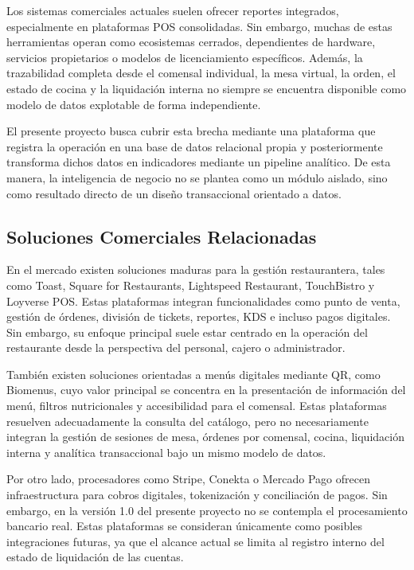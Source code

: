 Los sistemas comerciales actuales suelen ofrecer reportes integrados, especialmente en
plataformas POS consolidadas. Sin embargo, muchas de estas herramientas operan como
ecosistemas cerrados, dependientes de hardware, servicios propietarios o modelos de
licenciamiento espec\'ificos. Adem\'as, la trazabilidad completa desde el comensal individual,
la mesa virtual, la orden, el estado de cocina y la liquidaci\'on interna no siempre se
encuentra disponible como modelo de datos explotable de forma independiente.

El presente proyecto busca cubrir esta brecha mediante una plataforma que registra la
operaci\'on en una base de datos relacional propia y posteriormente transforma dichos datos
en indicadores mediante un pipeline anal\'itico. De esta manera, la inteligencia de negocio
no se plantea como un m\'odulo aislado, sino como resultado directo de un dise\~no transaccional
orientado a datos.

\subsection{Soluciones Comerciales Relacionadas}

En el mercado existen soluciones maduras para la gesti\'on restaurantera, tales como Toast,
Square for Restaurants, Lightspeed Restaurant, TouchBistro y Loyverse POS. Estas plataformas
integran funcionalidades como punto de venta, gesti\'on de \'ordenes, divisi\'on de tickets, reportes,
KDS e incluso pagos digitales. Sin embargo, su enfoque principal suele estar centrado en la
operaci\'on del restaurante desde la perspectiva del personal, cajero o administrador.

Tambi\'en existen soluciones orientadas a men\'us digitales mediante QR, como Biomenus, cuyo
valor principal se concentra en la presentaci\'on de informaci\'on del men\'u, filtros nutricionales
y accesibilidad para el comensal. Estas plataformas resuelven adecuadamente la consulta del
cat\'alogo, pero no necesariamente integran la gesti\'on de sesiones de mesa, \'ordenes por comensal,
cocina, liquidaci\'on interna y anal\'itica transaccional bajo un mismo modelo de datos.

Por otro lado, procesadores como Stripe, Conekta o Mercado Pago ofrecen infraestructura para
cobros digitales, tokenizaci\'on y conciliaci\'on de pagos. Sin embargo, en la versi\'on 1.0 del
presente proyecto no se contempla el procesamiento bancario real. Estas plataformas se
consideran \'unicamente como posibles integraciones futuras, ya que el alcance actual se limita
al registro interno del estado de liquidaci\'on de las cuentas.

